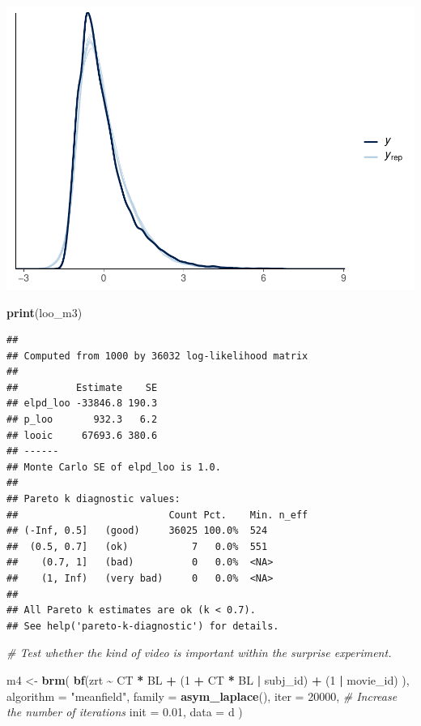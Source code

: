 \documentclass[
]{article}
\newenvironment{Shaded}{\begin{snugshade}}{\end{snugshade}}
\newcommand{\AttributeTok}[1]{\textcolor[rgb]{0.13,0.29,0.53}{#1}}
\newcommand{\CommentTok}[1]{\textcolor[rgb]{0.56,0.35,0.01}{\textit{#1}}}
\newcommand{\DecValTok}[1]{\textcolor[rgb]{0.00,0.00,0.81}{#1}}
\newcommand{\FloatTok}[1]{\textcolor[rgb]{0.00,0.00,0.81}{#1}}
\newcommand{\FunctionTok}[1]{\textcolor[rgb]{0.13,0.29,0.53}{\textbf{#1}}}
\newcommand{\NormalTok}[1]{#1}
\newcommand{\OtherTok}[1]{\textcolor[rgb]{0.56,0.35,0.01}{#1}}
\newcommand{\SpecialCharTok}[1]{\textcolor[rgb]{0.81,0.36,0.00}{\textbf{#1}}}
\newcommand{\StringTok}[1]{\textcolor[rgb]{0.31,0.60,0.02}{#1}}
\begin{document}
\includegraphics{20_variational_inference_files/figure-latex/Model with block as numeric-1.pdf}

\begin{Shaded}
\begin{Highlighting}[]
\FunctionTok{print}\NormalTok{(loo\_m3)}
\end{Highlighting}
\end{Shaded}

\begin{verbatim}
## 
## Computed from 1000 by 36032 log-likelihood matrix
## 
##          Estimate    SE
## elpd_loo -33846.8 190.3
## p_loo       932.3   6.2
## looic     67693.6 380.6
## ------
## Monte Carlo SE of elpd_loo is 1.0.
## 
## Pareto k diagnostic values:
##                          Count Pct.    Min. n_eff
## (-Inf, 0.5]   (good)     36025 100.0%  524       
##  (0.5, 0.7]   (ok)           7   0.0%  551       
##    (0.7, 1]   (bad)          0   0.0%  <NA>      
##    (1, Inf)   (very bad)     0   0.0%  <NA>      
## 
## All Pareto k estimates are ok (k < 0.7).
## See help('pareto-k-diagnostic') for details.
\end{verbatim}

\begin{Shaded}
\begin{Highlighting}[]
\CommentTok{\# Test whether the kind of video is important within the surprise experiment.}

\NormalTok{m4 }\OtherTok{\textless{}{-}} \FunctionTok{brm}\NormalTok{(}
  \FunctionTok{bf}\NormalTok{(zrt }\SpecialCharTok{\textasciitilde{}}\NormalTok{ CT }\SpecialCharTok{*}\NormalTok{ BL }\SpecialCharTok{+}
\NormalTok{       (}\DecValTok{1} \SpecialCharTok{+}\NormalTok{ CT }\SpecialCharTok{*}\NormalTok{ BL }\SpecialCharTok{|}\NormalTok{ subj\_id) }\SpecialCharTok{+}\NormalTok{ (}\DecValTok{1} \SpecialCharTok{|}\NormalTok{ movie\_id)}
\NormalTok{  ), }
  \AttributeTok{algorithm =} \StringTok{"meanfield"}\NormalTok{,}
  \AttributeTok{family =} \FunctionTok{asym\_laplace}\NormalTok{(),}
  \AttributeTok{iter =} \DecValTok{20000}\NormalTok{, }\CommentTok{\# Increase the number of iterations}
  \AttributeTok{init =} \FloatTok{0.01}\NormalTok{,}
  \AttributeTok{data =}\NormalTok{ d}
\NormalTok{)}
\end{Highlighting}
\end{Shaded}
\end{document}
